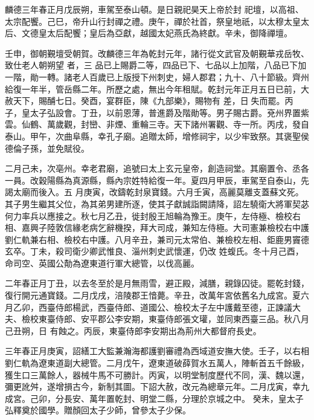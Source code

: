 
\begin{pinyinscope}

 麟德三年春正月戊辰朔，車駕至泰山頓。是日親祀昊天上帝於封
 祀壇，以高祖、太宗配饗。己巳，帝升山行封禪之禮。庚午，禪於社首，祭皇地祇，以太穆太皇太后、文德皇太后配饗；皇后為亞獻，越國太妃燕氏為終獻。辛未，御降禪壇。



 壬申，御朝覲壇受朝賀。改麟德三年為乾封元年，諸行從文武官及朝覲華戎岳牧、致仕老人朝朔望
 者，三
 品已上賜爵二等，四品已下、七品以上加階，八品已下加一階，勛一轉。諸老人百歲已上版授下州刺史，婦人郡君；九十、八十節級。齊州給復一年半，管岳縣二年。所歷之處，無出今年租賦。乾封元年正月五日已前，大赦天下，賜酺七日。癸酉，宴群臣，陳《九部樂》，賜物有
 差，日失而罷。丙子，皇太子弘設會。丁丑，以前恩薄，普進爵及階勛等。男子賜古爵。兗州界置紫雲。仙鶴、萬歲觀，封巒、非煙、重輪三寺。天下諸州署觀、寺一所。丙戌，發自泰山。甲午，次曲阜縣，幸孔子廟。追贈太師，增修祠宇，以少牢致祭。其褒聖侯德倫子孫，並免賦役。



 二月己未，次亳州。幸老君廟，追號曰太上玄元皇帝，創造祠堂。其廟置令、丞各一員。改穀陽縣為真源縣，縣內宗姓特給復一年。夏四月甲辰，車駕至自泰山，先謁太廟而後入。五
 月庚寅，改鑄乾封泉寶錢。六月壬寅，高麗莫離支蓋蘇文死。其子男生繼其父位，為其弟男建所逐，使其子獻誠詣闕請降，詔左驍衛大將軍契苾何力率兵以應接之。秋七月乙丑，徙封殷王旭輪為豫王。庚午，左侍極、檢校右相、嘉興子陸敦信緣老病乞辭機揆，拜大司成，兼知左侍極。大司憲兼檢校右中護劉仁軌兼右相、檢校右中護。八月辛丑，兼司元太常伯、兼檢校左相、鉅鹿男竇德玄卒。丁未，殺司衛少卿武惟良、淄州刺史武懷運，仍改
 姓蝮氏。冬十月己酉，命司空、英國公勣為遼東道行軍大總管，以伐高麗。



 二年春正月丁丑，以去冬至於是月無雨雪，避正殿，減膳，親錄囚徒。罷乾封錢，復行開元通寶錢。二月戊戌，涪陵郡王愔薨。辛丑，改萬年宮依舊名九成宮。夏六月乙卯，西臺侍郎楊武，西臺侍郎、道國公、檢校太子左中護戴至德，正諫議大夫、檢校東臺侍郎、安平郡公李安期，東臺侍郎張文瓘，並同東西臺三品。秋八月己丑朔，日
 有蝕之。丙辰，東臺侍郎李安期出為荊州大都督府長史。



 三年春正月庚寅，詔繕工大監兼瀚海都護劉審禮為西域道安撫大使。壬子，以右相劉仁軌為遼東道副大總管。二月戊午，遼東道破薛賀水五萬人，陣斬首五千餘級，獲生口三萬餘人，器械牛馬不可勝計。丙寅，以明堂制度歷代不同，漢、魏以還，彌更訛舛，遂增損古今，新制其圖。下詔大赦，改元為總章元年。二月戊寅，幸九成宮。己卯，分長安、萬年置乾封、明堂二縣，分理於京城之中。
 癸未，皇太子弘釋奠於國學。贈顏回太子少師，曾參太子少保。




\end{pinyinscope}
